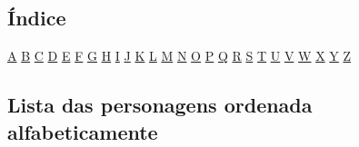 \documentclass[a4paper]{article}
\begin{document}
\subsection{Índice}
\hspace{4mm} \hyperlink{A}{A}
\hyperlink{B}{B}
\hyperlink{C}{C}
\hyperlink{D}{D}
\hyperlink{E}{E}
\hyperlink{F}{F}
\hyperlink{G}{G}
\hyperlink{H}{H}
\hyperlink{I}{I}
\hyperlink{J}{J}
\hyperlink{K}{K}
\hyperlink{L}{L}
\hyperlink{M}{M}
\hyperlink{N}{N}
\hyperlink{O}{O}
\hyperlink{P}{P}
\hyperlink{Q}{Q}
\hyperlink{R}{R}
\hyperlink{S}{S}
\hyperlink{T}{T}
\hyperlink{U}{U}
\hyperlink{V}{V}
\hyperlink{W}{W}
\hyperlink{X}{X}
\hyperlink{Y}{Y}
\hyperlink{Z}{Z}
\subsection{Lista das personagens ordenada alfabeticamente}
\end{document}
